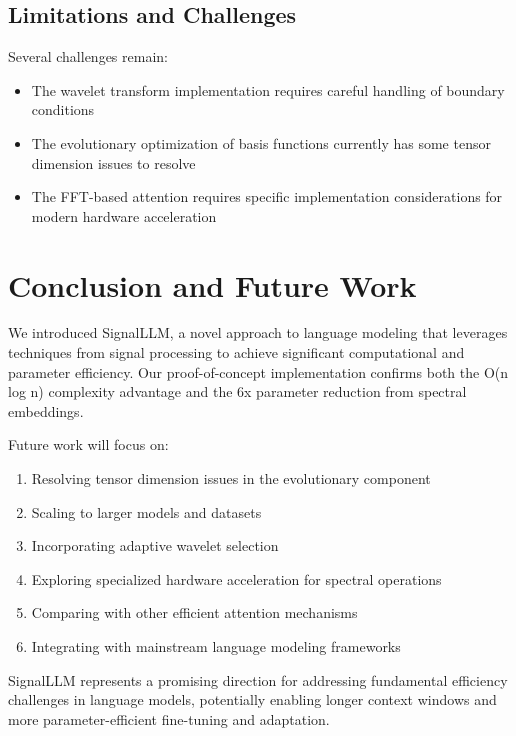 \documentclass[10pt,twocolumn,letterpaper]{article}
\begin{document}
\subsection{Limitations and Challenges}

Several challenges remain:

\begin{itemize}
    \item The wavelet transform implementation requires careful handling of boundary conditions
    \item The evolutionary optimization of basis functions currently has some tensor dimension issues to resolve
    \item The FFT-based attention requires specific implementation considerations for modern hardware acceleration
\end{itemize}

\section{Conclusion and Future Work}

We introduced SignalLLM, a novel approach to language modeling that leverages techniques from signal processing to achieve significant computational and parameter efficiency. Our proof-of-concept implementation confirms both the O(n log n) complexity advantage and the 6x parameter reduction from spectral embeddings.

Future work will focus on:

\begin{enumerate}
    \item Resolving tensor dimension issues in the evolutionary component
    \item Scaling to larger models and datasets
    \item Incorporating adaptive wavelet selection
    \item Exploring specialized hardware acceleration for spectral operations
    \item Comparing with other efficient attention mechanisms
    \item Integrating with mainstream language modeling frameworks
\end{enumerate}

SignalLLM represents a promising direction for addressing fundamental efficiency challenges in language models, potentially enabling longer context windows and more parameter-efficient fine-tuning and adaptation.

\medskip
\printbibliography
\end{document}
